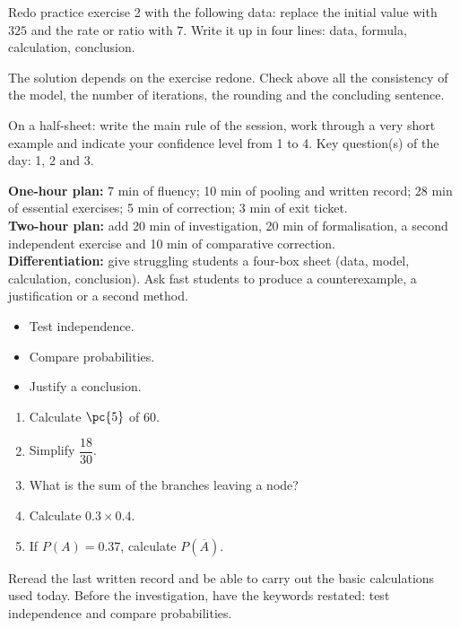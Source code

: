 
    \begin{homework}Redo practice exercise 2 with the following data: replace the initial value with $325$ and the rate or ratio with $7$. Write it up in four lines: data, formula, calculation, conclusion.\end{homework}
    \begin{solution}The solution depends on the exercise redone. Check above all the consistency of the model, the number of iterations, the rounding and the concluding sentence.\end{solution}

    \begin{exitticket}[3 minutes]On a half-sheet: write the main rule of the session, work through a very short example and indicate your confidence level from 1 to 4. Key question(s) of the day: 1, 2 and 3.\end{exitticket}

    \ifmxteacher
    \begin{method}
    \textbf{One-hour plan:} 7 min of fluency; 10 min of pooling and written record; 28 min of essential exercises; 5 min of correction; 3 min of exit ticket.\\
\textbf{Two-hour plan:} add 20 min of investigation, 20 min of formalisation, a second independent exercise and 10 min of comparative correction.\\
\textbf{Differentiation:} give struggling students a four-box sheet (data, model, calculation, conclusion). Ask fast students to produce a counterexample, a justification or a second method.
    \end{method}
    \fi
{}
\begin{objectives}\begin{itemize}\item Test independence.\item Compare probabilities.\item Justify a conclusion.\end{itemize}\end{objectives}
\begin{fluency}\begin{enumerate}\item Calculate $\pc{5}$ of $60$. \item Simplify $\dfrac{18}{30}$. \item What is the sum of the branches leaving a node? \item Calculate $\num{0,3}\times\num{0,4}$. \item If $P(A)=\num{0,37}$, calculate $P(\overline A)$. \end{enumerate}\end{fluency}
\begin{prerequisites}Reread the last written record and be able to carry out the basic calculations used today. Before the investigation, have the keywords restated: test independence and compare probabilities.\end{prerequisites}

